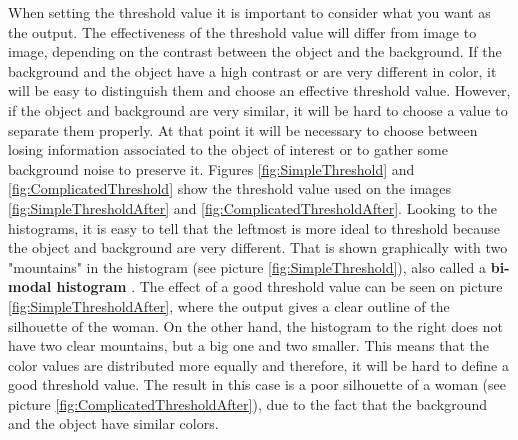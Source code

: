 When setting the threshold value it is important to consider what you want as the output. The effectiveness of the threshold value will differ from image to image, depending on the contrast between the object and the background. If the background and the object have a high contrast or are very different in color, it will be easy to distinguish them and choose an effective threshold value. However, if the object and background are very similar, it will be hard to choose a value to separate them properly. At that point it will be necessary to choose between losing information associated to the object of interest or to gather some background noise to preserve it. Figures \ref{fig:SimpleThreshold} and \ref{fig:ComplicatedThreshold} show the threshold value used on the images \ref{fig:SimpleThresholdAfter} and \ref{fig:ComplicatedThresholdAfter}. Looking to the histograms, it is easy to tell that the leftmost is more ideal to threshold because the object and background are very different. That is shown graphically with two "mountains" in the histogram (see picture \ref{fig:SimpleThreshold}), also called a \textbf{bi-modal histogram} \citep{ip_book}. The effect of a good threshold value can be seen on picture \ref{fig:SimpleThresholdAfter}, where the output gives a clear outline of the silhouette of the woman. On the other hand, the histogram to the right does not have two clear mountains, but a big one and two smaller. This means that the color values are distributed more equally and therefore, it will be hard to define a good threshold value. The result in this case is a poor silhouette of a woman (see picture \ref{fig:ComplicatedThresholdAfter}), due to the fact that the background and the object have similar colors.


